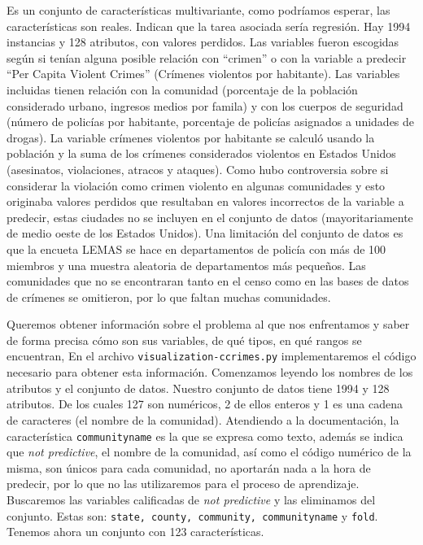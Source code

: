 \documentclass[a4paper, 20pt]{article}
\begin{document}
Es un conjunto de características multivariante, como podríamos esperar, las características son reales. Indican que la tarea asociada sería regresión. Hay 1994 instancias y 128 atributos, con valores perdidos. Las variables fueron escogidas según si tenían alguna posible relación con ``crimen'' o con la variable a predecir ``Per Capita Violent Crimes'' (Crímenes violentos por habitante). Las variables incluidas tienen relación con la comunidad (porcentaje de la población considerado urbano, ingresos medios por famila) y con los cuerpos de seguridad (número de policías por habitante, porcentaje de policías asignados a unidades de drogas). La variable crímenes violentos por habitante se calculó usando la población y la suma de los crímenes considerados violentos en Estados Unidos (asesinatos, violaciones, atracos y ataques). Como hubo controversia sobre si considerar la violación como crimen violento en algunas comunidades y esto originaba valores perdidos que resultaban en valores incorrectos de la variable a predecir, estas ciudades no se incluyen en el conjunto de datos (mayoritariamente de medio oeste de los Estados Unidos). Una limitación del conjunto de datos es que la encueta LEMAS se hace en departamentos de policía con más de 100 miembros y una muestra aleatoria de departamentos más pequeños. Las comunidades que no se encontraran tanto en el censo como en las bases de datos de crímenes se omitieron, por lo que faltan muchas comunidades.

Queremos obtener información sobre el problema al que nos enfrentamos y saber de forma precisa cómo son sus variables, de qué tipos, en qué rangos se encuentran, \cdots En el archivo \texttt{visualization-ccrimes.py} implementaremos el código necesario para obtener esta información. Comenzamos leyendo los nombres de los atributos y el conjunto de datos. Nuestro conjunto de datos tiene 1994 y 128 atributos. De los cuales 127 son numéricos, 2 de ellos enteros y 1 es una cadena de caracteres (el nombre de la comunidad). Atendiendo a la documentación, la característica \texttt{communityname} es la que se expresa como texto, además se indica que \textit{not predictive}, el nombre de la comunidad, así como el código numérico de la misma, son únicos para cada comunidad, no aportarán nada a la hora de predecir, por lo que no las utilizaremos para el proceso de aprendizaje. Buscaremos las variables calificadas de \textit{not predictive} y las eliminamos del conjunto. Estas son: \texttt{state, county, community, communityname} y \texttt{fold}. Tenemos ahora un conjunto con 123 características.
\end{document}
